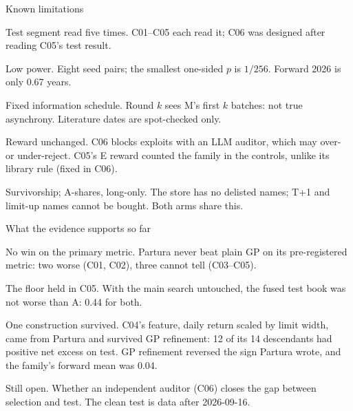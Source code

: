 \documentclass[t,20pt]{beamer}
\newcommand\key[1]{{\mediumfont\color{accent}#1}}
\newcommand\lead[1]{{\mediumfont #1}}
\newenvironment{blist}{%
  \begin{list}{\textcolor{sec}{\textbullet}}{\def\makelabel##1{##1\hfil}%
    \setlength\leftmargin{0.34in}\setlength\labelwidth{0.2in}\setlength\labelsep{0.14in}%
    \setlength\itemsep{16pt}\setlength\parsep{0pt}\setlength\topsep{0pt}\setlength\partopsep{0pt}%
    \setlength\itemindent{0pt}\setlength\listparindent{0pt}\setlength\rightmargin{0pt}}}%
  {\end{list}}
\newcounter{nl}
\newenvironment{nlist}{%
  \begin{list}{\textcolor{sec}{\arabic{nl}}}{\usecounter{nl}\def\makelabel##1{##1\hfil}%
    \setlength\leftmargin{0.40in}\setlength\labelwidth{0.26in}\setlength\labelsep{0.14in}%
    \setlength\itemsep{26pt}\setlength\parsep{0pt}\setlength\topsep{0pt}\setlength\partopsep{0pt}%
    \setlength\itemindent{0pt}\setlength\listparindent{0pt}\setlength\rightmargin{0pt}}}%
  {\end{list}}
\newcommand\textfirst{\vspace*{-0.14in}}
\begin{document}
\begin{frame}{Known limitations}
\textfirst
\begin{blist}
  \item \lead{Test segment read five times.} C01–C05 each read it; C06 was designed after reading C05's test result.
  \item \lead{Low power.} Eight seed pairs; the smallest one-sided $p$ is $1/256$. Forward 2026 is only 0.67 years.
  \item \lead{Fixed information schedule.} Round $k$ sees M's first $k$ batches: not true asynchrony. Literature dates are spot-checked only.
  \item \lead{Reward unchanged.} C06 blocks exploits with an LLM auditor, which may over- or under-reject. C05's E reward counted the family in the controls, unlike its library rule (fixed in C06).
  \item \lead{Survivorship; A-shares, long-only.} The store has no delisted names; T+1 and limit-up names cannot be bought. Both arms share this.
\end{blist}
\end{frame}

\begin{frame}{What the evidence supports so far}
\textfirst
\begin{nlist}
  \item \lead{No win on the primary metric.} Partura never beat plain GP on its pre-registered metric: two \key{worse} (C01, C02), three \key{cannot tell} (C03–C05).
  \item \lead{The floor held in C05.} With the main search untouched, the fused test book was not worse than A: 0.44 for both.
  \item \lead{One construction survived.} C04's feature, daily return scaled by limit width, came from Partura and survived GP refinement:
    12 of its 14 descendants had positive net excess on test. GP refinement reversed the sign Partura wrote, and the family's forward mean was 0.04.
  \item \lead{Still open.} Whether an independent auditor (C06) closes the gap between selection and test. The clean test is data after 2026-09-16.
\end{nlist}
\end{frame}
\end{document}
